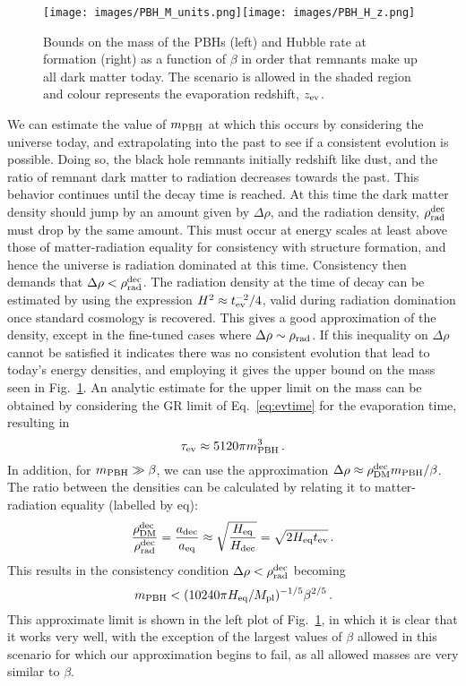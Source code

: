 \documentclass[reprint,amsmath,amssymbGaps,onecolumn,notitlepage,nofootinbib]{revtex4-1}
\begin{document}
\begin{figure}[t!]
\centering
\texttt{[image: images/PBH\_M\_units.png]}\texttt{[image: images/PBH\_H\_z.png]}
\caption{Bounds on the mass of the PBHs (left) and Hubble rate at formation (right) as a function of $\beta$ in order that remnants make up all dark matter today. The scenario is allowed in the shaded region and colour represents the evaporation redshift, $z_{\rm ev}$.}
\label{fig:DMC}
\end{figure}

We can estimate the value of $m_{\rm PBH}$ at which this occurs by considering the universe today, and extrapolating into the past to 
see if a consistent evolution is possible. 
Doing so, the black hole remnants initially redshift like dust, and the ratio of remnant dark matter to radiation decreases towards the past. This behavior continues 
until the decay time is reached. At this time the dark matter density should jump by an amount given by $\Delta \rho$, and 
the radiation density, $\rho_{{\rm rad}}^{\rm dec}$ must drop by the same amount. This must occur at energy scales at least above those of matter-radiation equality for consistency with
structure formation, and hence the universe is radiation dominated at this time. Consistency then demands that $\Delta \rho < \rho_{{\rm rad}}^{\rm dec}$. The radiation density 
at the time of decay can be 
estimated by using the expression $ H^2 \approx t_{\rm ev}^{-2}/4 $, valid during radiation domination once standard cosmology is recovered. This gives a good approximation of the density, except in the fine-tuned cases where $\Delta \rho\sim \rho_{\rm rad}$. If this inequality on $\Delta \rho$ cannot be satisfied it indicates there was no consistent evolution that lead to today's energy densities, and 
employing it gives the upper bound on the mass seen in Fig.~\ref{fig:DMC}. An analytic estimate for the upper limit on the mass can be obtained by considering the GR limit of Eq.~\eqref{eq:evtime} for the evaporation time, resulting in
\begin{equation}
    \tau_{\rm ev}\approx 5120\pi m_{\rm PBH}^3\,.
\end{equation}
In addition, for $m_{\rm PBH}\gg \beta$, we can use the approximation $\Delta \rho\approx \rho_{{\rm DM}}^{\rm dec} m_{\rm PBH}/\beta$. The ratio between the densities can be calculated by relating it to matter-radiation equality (labelled by eq):
\begin{equation}
    \frac{\rho_{{\rm DM}}^{\rm dec}}{\rho_{{\rm rad}}^{\rm dec}}=\frac{a_{\rm dec}}{a_{\rm eq}}\approx\sqrt{\frac{H_{\rm eq}}{H_{\rm dec}}}=\sqrt{2H_{\rm eq}t_{\rm ev}}\,.
\end{equation}
This results in the consistency condition $\Delta \rho < \rho_{{\rm rad}}^{\rm dec}$ becoming 
\begin{equation}
   m_{\rm PBH}<(10240\pi H_{\rm eq} / M_{\rm pl})^{-1/5}\beta^{2/5}\,.
\end{equation}
This approximate limit is shown in the left plot of Fig.~\ref{fig:DMC}, in which it is clear that it works very well, with the exception of the largest values of $\beta$ allowed in this scenario for which our approximation begins to fail, as all allowed masses are very similar to $\beta$. 
\end{document}
